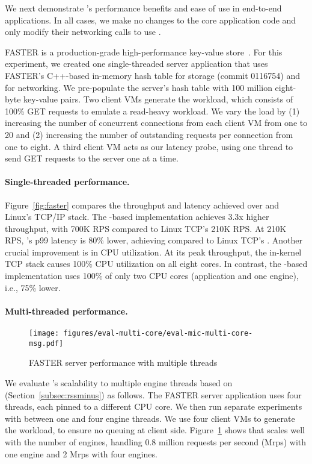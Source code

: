 We next demonstrate \mt{}'s performance benefits and ease of use in end-to-end applications.
In all cases, we make no changes to the core application code and only modify their networking calls to use \mt{}.

FASTER is a production-grade high-performance key-value store~\cite{faster-kv,faster-github}.
For this experiment, we created one single-threaded server application that uses FASTER's C++-based in-memory hash table for storage (commit 0116754) and \mt{} for networking.
We pre-populate the server's hash table with 100 million eight-byte key-value pairs.
Two client VMs generate the workload, which consists of 100\% GET requests to emulate a read-heavy workload.
We vary the load by (1) increasing the number of concurrent connections from each client VM from one to 20 and (2) increasing the number of outstanding requests per connection from one to eight.
A third client VM acts as our latency probe, using one thread to send GET requests to the server one at a time.

\paragraph{Single-threaded performance.}
Figure~\ref{fig:faster} compares the throughput and latency achieved over \mt{} and Linux's TCP/IP stack.
The \mt{}-based implementation achieves 3.3x higher throughput, with 700K RPS compared to Linux TCP's 210K RPS.
At 210K RPS, \mt{}'s p99 latency is 80\% lower, achieving  compared to Linux TCP's .
Another crucial improvement is in CPU utilization.
At its peak throughput, the in-kernel TCP stack causes 100\%  CPU utilization on all eight cores.
In contrast, the \mt{}-based implementation uses 100\% of only two CPU cores (application and one engine), i.e., 75\% lower.

\paragraph{Multi-threaded performance.}
\label{subsec:eval-multi-core}

\begin{figure}
    \centering
    \texttt{[image: figures/eval-multi-core/eval-mic-multi-core-msg.pdf]}
    \caption{FASTER server performance with multiple threads}
    \label{tput:par:mmps}
    \vspace{-0.5cm}
\end{figure}

We evaluate \mt{}'s scalability to multiple engine threads based on \rssminus{} (Section~\ref{subsec:rssminus}) as follows.
The FASTER server application uses four threads, each pinned to a different CPU core.
We then run separate experiments with between one and four \mt{} engine threads.
We use four client VMs to generate the workload, to ensure no queuing at client side.
Figure~\ref{tput:par:mmps} shows that \mt{} scales well with the number of engines, handling 0.8 million requests per second (Mrps) with one engine and 2 Mrps with four engines.

